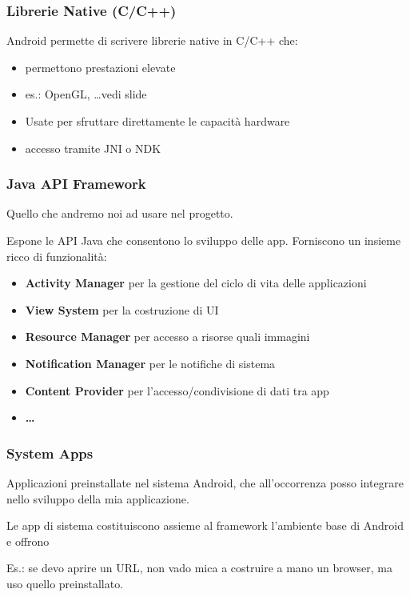 \subsubsection{Librerie Native (C/C++)}
\par Android permette di scrivere librerie native in C/C++ che:
\begin{itemize}
    \item permettono prestazioni elevate
    \item es.: OpenGL, \dots vedi slide
    \item Usate per sfruttare direttamente le capacità hardware
    \item accesso tramite JNI o NDK
\end{itemize}

\subsubsection{Java API Framework}
\par Quello che andremo noi ad usare nel progetto.
\par Espone le API Java che consentono lo sviluppo delle app. Forniscono un insieme ricco di funzionalità:
\begin{itemize}
    \item \textbf{Activity Manager} per la gestione del ciclo di vita delle applicazioni
    \item \textbf{View System} per la costruzione di UI
    \item \textbf{Resource Manager} per accesso a risorse quali immagini
    \item \textbf{Notification Manager} per le notifiche di sistema
    \item \textbf{Content Provider} per l'accesso/condivisione di dati tra app
    \item \textbf{\dots}
\end{itemize}

\subsubsection{System Apps}
\par Applicazioni preinstallate nel sistema Android, che all'occorrenza posso integrare nello sviluppo della mia applicazione.
\par Le app di sistema costituiscono assieme al framework l'ambiente base di Android e offrono 
\par Es.: se devo aprire un URL, non vado mica a costruire a mano un browser, ma uso quello preinstallato.

